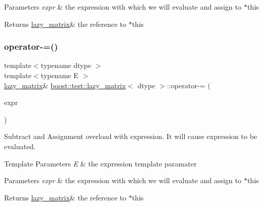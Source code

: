 \begin{DoxyParams}{Parameters}
{\em expr} & the expression with which we will evaluate and assign to $\ast$this \\
\hline
\end{DoxyParams}
\begin{DoxyReturn}{Returns}
\mbox{\hyperlink{classboost_1_1test_1_1lazy__matrix}{lazy\+\_\+matrix}}\& the reference to $\ast$this 
\end{DoxyReturn}
\mbox{\label{classboost_1_1test_1_1lazy__matrix_a5c15de9d35dd185a1e6d9101861969e5}} 
\subsubsection{\texorpdfstring{operator-\/=()}{operator-=()}}
{\footnotesize\ttfamily template$<$typename dtype $>$ \\
template$<$typename E $>$ \\
\mbox{\hyperlink{classboost_1_1test_1_1lazy__matrix}{lazy\+\_\+matrix}}\& \mbox{\hyperlink{classboost_1_1test_1_1lazy__matrix}{boost\+::test\+::lazy\+\_\+matrix}}$<$ dtype $>$\+::operator-\/= (\begin{DoxyParamCaption}\item[{\mbox{\hyperlink{classboost_1_1test_1_1expression}{expression}}$<$ E $>$ const \&}]{expr }\end{DoxyParamCaption})\hspace{0.3cm}{\ttfamily [inline]}}



Subtract and Assignment overload with expression. It will cause expression to be evaluated. 


\begin{DoxyTemplParams}{Template Parameters}
{\em E} & the expression template paramater \\
\hline
\end{DoxyTemplParams}

\begin{DoxyParams}{Parameters}
{\em expr} & the expression with which we will evaluate and assign to $\ast$this \\
\hline
\end{DoxyParams}
\begin{DoxyReturn}{Returns}
\mbox{\hyperlink{classboost_1_1test_1_1lazy__matrix}{lazy\+\_\+matrix}}\& the reference to $\ast$this 
\end{DoxyReturn}
\mbox{\label{classboost_1_1test_1_1lazy__matrix_a61f876fb99d8f85ee3f7cee3142ab1cf}} 

